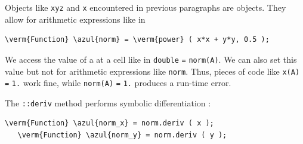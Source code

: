 Objects like {\small\tt xyz} and {\small\tt x} encountered in previous paragraphs
are {\small\tt {}} objects.
They allow for arithmetic expressions like in

\begin{Verbatim}[commandchars=\\\{\},formatcom=\small\tt,baselinestretch=0.94]
   \verm{Function} \azul{norm} = \verm{power} ( x*x + y*y, 0.5 );
\end{Verbatim}

We access the value of a {\small\tt {}} at a cell like in {\small\tt double}
{\small\tt {}} {\small\tt =} {\small\tt norm(A)}.
We can also set this value but not for arithmetic expressions like {\small\tt norm}.
Thus, pieces of code like {\small\tt x(A)} {\small\tt =} {\small\tt 1.} work fine,
while {\small\tt norm(A)} {\small\tt =} {\small\tt 1.} produces a run-time error.

The {\small\tt {}::deriv} method performs symbolic differentiation :

\begin{Verbatim}[commandchars=\\\{\},formatcom=\small\tt,baselinestretch=0.94]
   \verm{Function} \azul{norm_x} = norm.deriv ( x );
   \verm{Function} \azul{norm_y} = norm.deriv ( y );
\end{Verbatim}


